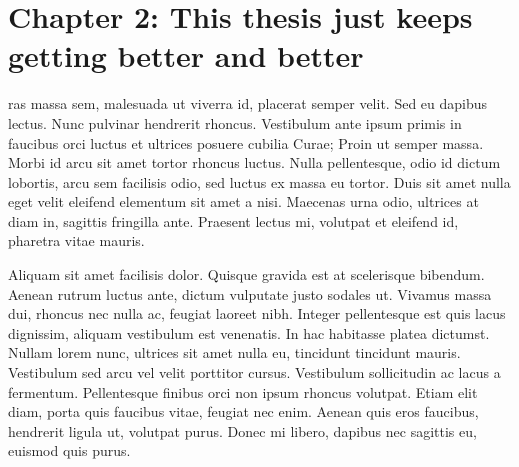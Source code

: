 \section{Chapter 2: This thesis just keeps getting better and better}

ras massa sem, malesuada ut viverra id, placerat semper velit. Sed eu dapibus lectus. Nunc pulvinar hendrerit rhoncus. Vestibulum ante ipsum primis in faucibus orci luctus et ultrices posuere cubilia Curae; Proin ut semper massa. Morbi id arcu sit amet tortor rhoncus luctus. Nulla pellentesque, odio id dictum lobortis, arcu sem facilisis odio, sed luctus ex massa eu tortor. Duis sit amet nulla eget velit eleifend elementum sit amet a nisi. Maecenas urna odio, ultrices at diam in, sagittis fringilla ante. Praesent lectus mi, volutpat et eleifend id, pharetra vitae mauris.

Aliquam sit amet facilisis dolor. Quisque gravida est at scelerisque bibendum. Aenean rutrum luctus ante, dictum vulputate justo sodales ut. Vivamus massa dui, rhoncus nec nulla ac, feugiat laoreet nibh. Integer pellentesque est quis lacus dignissim, aliquam vestibulum est venenatis. In hac habitasse platea dictumst. Nullam lorem nunc, ultrices sit amet nulla eu, tincidunt tincidunt mauris. Vestibulum sed arcu vel velit porttitor cursus. Vestibulum sollicitudin ac lacus a fermentum. Pellentesque finibus orci non ipsum rhoncus volutpat. Etiam elit diam, porta quis faucibus vitae, feugiat nec enim. Aenean quis eros faucibus, hendrerit ligula ut, volutpat purus. Donec mi libero, dapibus nec sagittis eu, euismod quis purus.
